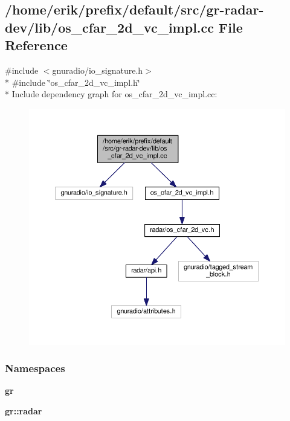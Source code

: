 \subsection{/home/erik/prefix/default/src/gr-\/radar-\/dev/lib/os\+\_\+cfar\+\_\+2d\+\_\+vc\+\_\+impl.cc File Reference}
\label{os__cfar__2d__vc__impl_8cc}
{\ttfamily \#include $<$gnuradio/io\+\_\+signature.\+h$>$}\\*
{\ttfamily \#include \char`\"{}os\+\_\+cfar\+\_\+2d\+\_\+vc\+\_\+impl.\+h\char`\"{}}\\*
Include dependency graph for os\+\_\+cfar\+\_\+2d\+\_\+vc\+\_\+impl.\+cc\+:
\nopagebreak
\begin{figure}[H]
\begin{center}
\leavevmode
\includegraphics[width=350pt]{de/daa/os__cfar__2d__vc__impl_8cc__incl}
\end{center}
\end{figure}
\subsubsection*{Namespaces}
\begin{DoxyCompactItemize}
\item 
 {\bf gr}
\item 
 {\bf gr\+::radar}
\end{DoxyCompactItemize}

